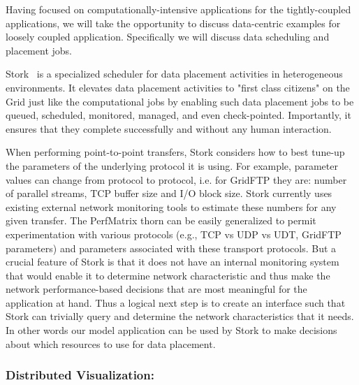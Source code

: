 \documentclass[conference,final]{IEEEtran}
\newcommand{\jhanote}[1]{ {\textcolor{red} { ***Jha: #1 }}}
\begin{document}
Having focused on computationally-intensive applications for the
tightly-coupled applications, we will take the opportunity to discuss
data-centric examples for loosely coupled application.  Specifically
we will discuss data scheduling and placement jobs.

Stork~\cite{stork_url, kosar_scpe05} is a specialized scheduler for
data placement activities in heterogeneous environments.  It elevates
data placement activities to "first class citizens" on the Grid just
like the computational jobs by enabling such data placement jobs to be
queued, scheduled, monitored, managed, and even check-pointed.
Importantly, it ensures that they complete successfully and without
any human interaction.

When performing point-to-point transfers, Stork considers how to best
tune-up the parameters of the underlying protocol it is using. For
example, parameter values can change from protocol to protocol, i.e.
for GridFTP they are: number of parallel streams, TCP buffer size and
I/O block size.  Stork currently uses existing external network
monitoring tools to estimate these numbers for any given transfer.
The PerfMatrix thorn can be easily generalized to permit
experimentation with various protocols (e.g., TCP vs UDP vs UDT,
GridFTP parameters) and parameters associated with these transport
protocols.  But a crucial feature of Stork is that it does not have an
internal monitoring system that would enable it to determine network
characteristic and thus make the network performance-based decisions
that are most meaningful for the application at hand. Thus a logical
next step is to create an interface such that Stork can trivially
query and determine the network characteristics that it needs.  In
other words our model application can be used by Stork to make
decisions about which resources to use for data placement.



\subsubsection{Distributed Visualization:} 
\end{document}
